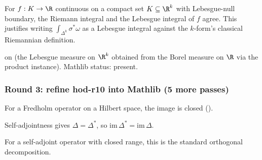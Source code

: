 \begin{lemma}
\label{lem:dis-r14}
For $f : K \to \R$ continuous on a compact set $K \subseteq \R^{k}$ with Lebesgue-null boundary, the Riemann integral and the Lebesgue integral of $f$ agree.  This justifies writing $\int_{\Delta^{k}}\sigma^{*}\omega$ as a Lebesgue integral against the $k$-form's classical Riemannian definition.
\leanok\mathlibok
\end{lemma}

\begin{lemma}
\label{lem:dis-r15}
 on  (the Lebesgue measure on $\R^{k}$ obtained from the Borel measure on $\R$ via the product instance).  Mathlib status: present.
\leanok\mathlibok
\end{lemma}

\subsubsection*{Round 3: refine hod-r10 into Mathlib (5 more passes)}

\begin{lemma}
\label{lem:hod-r11}
For a Fredholm operator on a Hilbert space, the image is closed ().
\leanok\mathlibok
\end{lemma}

\begin{lemma}[Pass hod.12: self-adjoint $\Delta$ has $\mathrm{im}\,\Delta^{*} = \mathrm{im}\,\Delta$]
\label{lem:hod-r12}
Self-adjointness gives $\Delta = \Delta^{*}$, so $\mathrm{im}\,\Delta^{*} = \mathrm{im}\,\Delta$.
\leanok
\end{lemma}

\begin{lemma}[Pass hod.13: $L^{2} = \ker\Delta\oplus\mathrm{im}\,\Delta$]
\label{lem:hod-r13}
For a self-adjoint operator with closed range, this is the standard orthogonal decomposition.
\leanok
\end{lemma}

